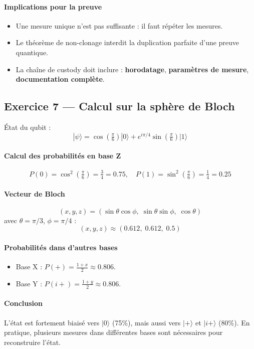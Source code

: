 \documentclass[11pt]{article}
\begin{document}
\paragraph{Implications pour la preuve}
\begin{itemize}
  \item Une mesure unique n’est pas suffisante : il faut répéter les mesures.
  \item Le théorème de non-clonage interdit la duplication parfaite d’une preuve quantique.
  \item La chaîne de custody doit inclure : \textbf{horodatage}, \textbf{paramètres de mesure}, \textbf{documentation complète}.
\end{itemize}

\subsection{Exercice 7 — Calcul sur la sphère de Bloch}

État du qubit :
\[
|\psi\rangle = \cos\!\left(\tfrac{\pi}{6}\right)|0\rangle 
+ e^{i\pi/4}\sin\!\left(\tfrac{\pi}{6}\right)|1\rangle
\]

\paragraph{Calcul des probabilités en base Z}
\[
P(0) = \cos^2\!\left(\tfrac{\pi}{6}\right) = \tfrac{3}{4} = 0.75,
\quad
P(1) = \sin^2\!\left(\tfrac{\pi}{6}\right) = \tfrac{1}{4} = 0.25
\]

\paragraph{Vecteur de Bloch}
\[
(x,y,z) = (\sin\theta \cos\phi,\; \sin\theta \sin\phi,\; \cos\theta)
\]
avec $\theta=\pi/3$, $\phi=\pi/4$ :
\[
(x,y,z) \approx (0.612,\;0.612,\;0.5)
\]

\paragraph{Probabilités dans d’autres bases}
\begin{itemize}
  \item Base X : $P(+)=\tfrac{1+x}{2}\approx 0.806$.
  \item Base Y : $P(i+)=\tfrac{1+y}{2}\approx 0.806$.
\end{itemize}

\paragraph{Conclusion}
L’état est fortement biaisé vers $|0\rangle$ (75\%), mais aussi vers $|+\rangle$ et $|i+\rangle$ (80\%).  
En pratique, plusieurs mesures dans différentes bases sont nécessaires pour reconstruire l’état.
\end{document}
